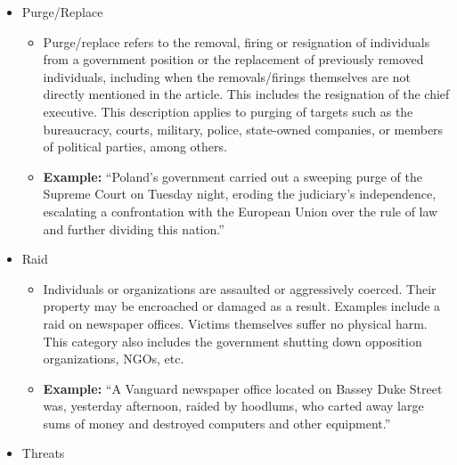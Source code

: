 \documentclass[
  letterpaper,
  DIV=11,
  numbers=noendperiod]{scrartcl}
\providecommand{\tightlist}{%
  \setlength{\itemsep}{0pt}\setlength{\parskip}{0pt}}\usepackage{longtable,booktabs,array}
\begin{document}
\begin{itemize}
  \begin{itemize}
  \tightlist
  \item
    Planned or spontaneous public mobilization of a large group of
    people. Labor strikes, political rallies and riots are also included
    in this category. When protest events involve deaths, they are coded
    as lethal violence, but this does not apply for non-lethal violence
    incidents.
  \item
    \textbf{Example:} ``A reported two thousand people took to the
    streets yesterday in Nairobi to protest rising fuel prices, which
    have doubled since the beginning of the year.''
  \end{itemize}
\item
  Purge/Replace

  \begin{itemize}
  \tightlist
  \item
    Purge/replace refers to the removal, firing or resignation of
    individuals from a government position or the replacement of
    previously removed individuals, including when the removals/firings
    themselves are not directly mentioned in the article. This includes
    the resignation of the chief executive. This description applies to
    purging of targets such as the bureaucracy, courts, military,
    police, state-owned companies, or members of political parties,
    among others.
  \item
    \textbf{Example:} ``Poland's government carried out a sweeping purge
    of the Supreme Court on Tuesday night, eroding the judiciary's
    independence, escalating a confrontation with the European Union
    over the rule of law and further dividing this nation.''
  \end{itemize}
\item
  Raid

  \begin{itemize}
  \tightlist
  \item
    Individuals or organizations are assaulted or aggressively coerced.
    Their property may be encroached or damaged as a result. Examples
    include a raid on newspaper offices. Victims themselves suffer no
    physical harm. This category also includes the government shutting
    down opposition organizations, NGOs, etc.
  \item
    \textbf{Example:} ``A Vanguard newspaper office located on Bassey
    Duke Street was, yesterday afternoon, raided by hoodlums, who carted
    away large sums of money and destroyed computers and other
    equipment.''
  \end{itemize}
\item
  Threats


\end{itemize}
\end{document}
